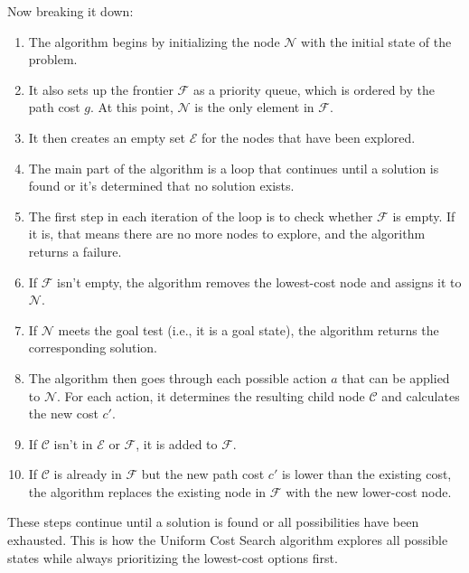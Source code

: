 \documentclass[a4paper,UKenglish,cleveref, autoref, thm-restate]{qlinhta}
\begin{document}
Now breaking it down:
\begin{enumerate}
    \item The algorithm begins by initializing the node $\mathcal{N}$ with the initial state of the problem.
    \item It also sets up the frontier $\mathcal{F}$ as a priority queue, which is ordered by the path cost $g$. At this point, $\mathcal{N}$ is the only element in $\mathcal{F}$.
    \item It then creates an empty set $\mathcal{E}$ for the nodes that have been explored.
    \item The main part of the algorithm is a loop that continues until a solution is found or it's determined that no solution exists.
    \item The first step in each iteration of the loop is to check whether $\mathcal{F}$ is empty. If it is, that means there are no more nodes to explore, and the algorithm returns a failure.
    \item If $\mathcal{F}$ isn't empty, the algorithm removes the lowest-cost node and assigns it to $\mathcal{N}$.
    \item If $\mathcal{N}$ meets the goal test (i.e., it is a goal state), the algorithm returns the corresponding solution.
    \item The algorithm then goes through each possible action $a$ that can be applied to $\mathcal{N}$. For each action, it determines the resulting child node $\mathcal{C}$ and calculates the new cost $c'$.
    \item If $\mathcal{C}$ isn't in $\mathcal{E}$ or $\mathcal{F}$, it is added to $\mathcal{F}$.
    \item If $\mathcal{C}$ is already in $\mathcal{F}$ but the new path cost $c'$ is lower than the existing cost, the algorithm replaces the existing node in $\mathcal{F}$ with the new lower-cost node.
\end{enumerate}
\vspace{5pt}
These steps continue until a solution is found or all possibilities have been exhausted. This is how the Uniform Cost Search algorithm explores all possible states while always prioritizing the lowest-cost options first.
\end{document}
